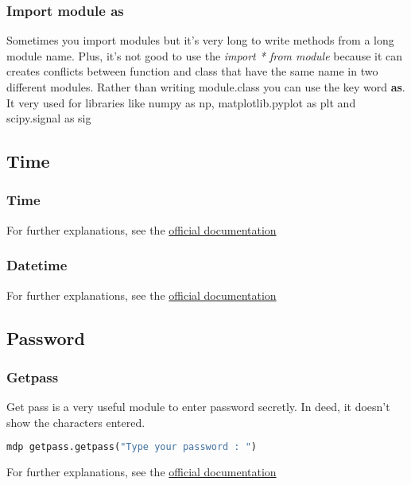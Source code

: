 \documentclass[a4paper, 12pt, titlepage]{scrartcl} %
\begin{document}
\subsubsection{Import module as}
Sometimes you import modules but it's very long to write methods from a long module name. Plus, it's not good to use the \textit{import * from module} because it can creates conflicts between function and class that have the same name in two different modules. Rather than writing module.class you can use the key word \textbf{as}. It very used for libraries like numpy as np, matplotlib.pyplot as plt and scipy.signal as sig
\label{As}

\subsection{Time}
\subsubsection{Time}
For further explanations, see the \href{https://docs.python.org/3/library/time.html}{official documentation}

\subsubsection{Datetime}
For further explanations, see the \href{https://docs.python.org/3/library/datetime.html}{official documentation}

\subsection{Password}

\subsubsection{Getpass}
Get pass is a very useful module to enter password secretly. In deed, it doesn't show the characters entered.
\begin{lstlisting}[language=Python]
mdp getpass.getpass("Type your password : ")
\end{lstlisting}

For further explanations, see the \href{https://docs.python.org/3/library/getpass.html}{official documentation}
\end{document}
